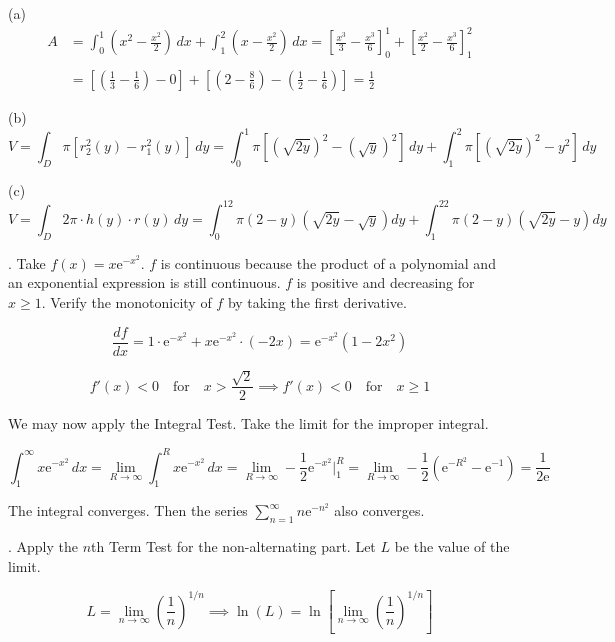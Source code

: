 \documentclass{article}
\begin{document}
\noindent (a)
\begin{align*}A&=\int_0^1\left(x^2-\frac{x^2}2\right)\,dx+\int_1^2\left(x-\frac{x^2}2\right)\,dx=\left[\frac{x^3}3-\frac{x^3}6\right]_0^1+\left[\frac{x^2}2-\frac{x^3}6\right]_1^2\\\\&=\left[\left(\frac13-\frac16\right)-0\right]+\left[\left(2-\frac86\right)-\left(\frac12-\frac16\right)\right]=\boxed{\frac12}\end{align*}

\noindent (b)
\[V=\int_D\pi\left[r_2^2(y)-r_1^2(y)\right]\,dy=\boxed{\int_0^1\pi\left[\left(\sqrt{2y}\right)^2-\left(\sqrt y\right)^2\right]\,dy+\int_1^2\pi\left[\left(\sqrt{2y}\right)^2-y^2\right]\,dy}\]

\noindent (c)
\[V=\int_D2\pi\cdot h(y)\cdot r(y)\,dy=\boxed{\int_0^12\pi(2-y)\left(\sqrt{2y}-\sqrt{y}\right)dy+\int_1^22\pi(2-y)\left(\sqrt{2y}-y\right)dy}\]

\hfill

. Take $f(x)=x\mathrm{e}^{-x^2}$. $f$ is continuous because the product of a polynomial and an exponential expression is still continuous. $f$ is positive and decreasing for $x\geq1$. Verify the monotonicity of $f$ by taking the first derivative.

\[\frac{df}{dx}=1\cdot\mathrm{e}^{-x^2}+x\mathrm{e}^{-x^2}\cdot(-2x)=\mathrm{e}^{-x^2}\left(1-2x^2\right)\]

\[f'(x)<0\quad\text{for}\quad x>\frac{\sqrt2}2\implies f'(x)<0\quad\text{for}\quad x\geq1\]

\hfill

\noindent We may now apply the Integral Test. Take the limit for the improper integral.

\[\int_1^{\infty}x\mathrm{e}^{-x^2}\,dx=\lim_{R\to\infty}\int_1^Rx\mathrm{e}^{-x^2}\,dx=\lim_{R\to\infty}-\frac12\mathrm{e}^{-x^2}\Bigg|_1^R=\lim_{R\to\infty}-\frac12\left(\mathrm{e}^{-R^2}-\mathrm{e^{-1}}\right)=\frac1{2\mathrm{e}}\]

\hfill

\noindent The integral converges. Then the series $\displaystyle\sum_{n=1}^{\infty}n\mathrm{e}^{-n^2}$ also converges.

\hfill

. Apply the $n$th Term Test for the non-alternating part. Let $L$ be the value of the limit.

\[L=\lim_{n\to\infty}\left(\frac1n\right)^{1/n}\implies\ln(L)=\ln\left[\lim_{n\to\infty}\left(\frac1n\right)^{1/n}\right]\]
\end{document}
